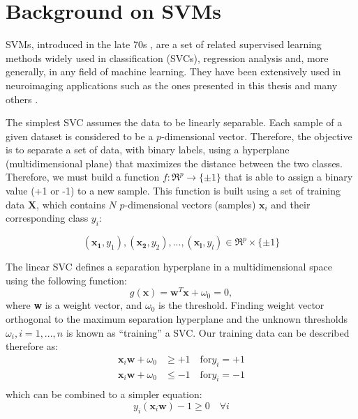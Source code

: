 \chapter{Background on \acfp{SVM}}\label{ch:svm}
\acfp{SVM}, introduced in the late 70s \cite{Vapnik1998}, are a set of related supervised learning methods widely used in classification (\acp{SVC}), regression analysis and, more generally, in any field of machine learning. They have been extensively used in neuroimaging applications such as the ones presented in this thesis \cite{Martinez-Murcia2013255,Martinez-Murcia201458,martinez2014parametrization,Martinez-Murcia2015,Martinez-Murcia2016,Martinez-Murcia2016a} and many others \cite{Stoeckel04,Towey2011,Illan2011,Illan2012,Ortiz2013,Segovia2016a}.

The simplest \ac{SVC} assumes the data to be linearly separable. Each sample of a given dataset is considered to be a $p$-dimensional vector. Therefore, the objective is to separate a set of data, with binary labels, using a hyperplane (multidimensional plane) that maximizes the distance between the two classes. Therefore, we must build a function $f : \Re^p \rightarrow \lbrace \pm1 \rbrace$ that is able to assign a binary value (+1 or -1) to a new sample. This function is built using a set of training data $\mathbf{X}$, which contains $N$ $p$-dimensional vectors (samples) $\mathbf{x}_i$ and their corresponding class $y_i$: 

\begin{equation}
(\mathbf{x_1} , y_1 ), (\mathbf{x_2} , y_2 ), ..., (\mathbf{x_l} , y_l ) \in \Re^p \times \lbrace \pm 1\rbrace
\end{equation}

The linear \ac{SVC} defines a separation hyperplane in a multidimensional space using the following function: 
\begin{equation}
g(\textbf{x}) = \textbf{w}^T \textbf{x} + \omega_0 = 0,
\end{equation}
where \textbf{w} is a weight vector, and $\omega_0$ is the threshold. Finding weight vector orthogonal to the maximum separation hyperplane and the unknown thresholds  $\omega_i , i = 1,...,n$ is known as ``training'' a \ac{SVC}. Our training data can be described therefore as: 
\begin{align}
	\mathbf{x}_i\mathbf{w} + \omega_0 &\ge +1 \quad \text{for} y_i = +1\\
	\mathbf{x}_i\mathbf{w} + \omega_0 &\le -1 \quad \text{for} y_i = -1\\
\end{align}
which can be combined to a simpler equation:
\begin{equation}\label{eq:constraint}
	y_i(\mathbf{x}_i\mathbf{w})-1\ge 0 \quad \forall i
\end{equation}

